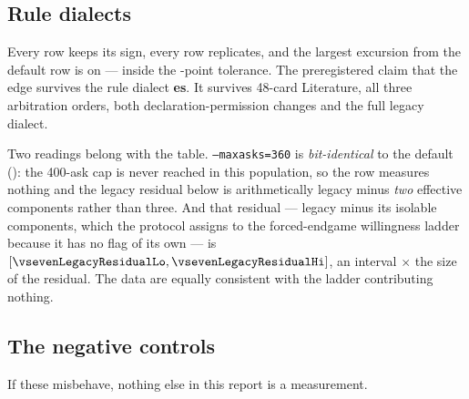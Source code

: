 \begin{table}[t]\centering
\caption{The three runs head to head, establishing that they are distinguishable policies.}
\label{tab:crossh2h}

\end{table}

\subsection{Rule dialects}
\label{sec:results-dialects}

\begin{table}[t]\centering
\caption{The rule-dialect table, unbundled. Both arms play the same dialect in every row. This is the
first dialect sweep of its kind in the corpus and has no training-bank counterpart to be checked
against.}
\label{tab:dialects}
{\small}
\end{table}

Every row keeps its sign, every row replicates, and the largest excursion from the default row is
\vsevenDiaMaxExcursion{} on \vsevenDiaMaxExcursionRow{} --- inside the
\vsevenSfiveTolerance{}-point tolerance. The preregistered claim that the edge survives the rule
dialect \textbf{\vsevenSfiveVerdict{}es}. It survives 48-card Literature, all three arbitration
orders, both declaration-permission changes and the full legacy dialect.

Two readings belong with the table. \texttt{--maxasks=360} is \emph{bit-identical} to the default
(\vsevenMaxasksIdentical{}): the 400-ask cap is never reached in this population, so the row measures
nothing and the legacy residual below is arithmetically legacy minus \emph{two} effective components
rather than three. And that residual --- legacy minus its isolable components, which the protocol
assigns to the forced-endgame willingness ladder because it has no flag of its own --- is
\vsevenLegacyResidual{} $[\vsevenLegacyResidualLo, \vsevenLegacyResidualHi]$, an interval
\vsevenLegacyResidualRatio$\times$ the size of the residual. The data are equally consistent with the
ladder contributing nothing.

\subsection{The negative controls}
\label{sec:results-controls}

If these misbehave, nothing else in this report is a measurement.

\begin{table}[t]\centering
\caption{Planted-edge recovery. The recovered excess is the responder's edge against the handicapped
target minus its edge against the unhandicapped one. The sub-floor rung must \emph{not} be recovered.}
\label{tab:controls}
{\small}
\end{table}


